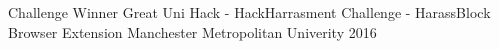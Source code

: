 
\begin{cvhonors}

  \cvhonor
    {Challenge Winner} %
    {Great Uni Hack - HackHarrasment Challenge - HarassBlock Browser Extension} %
    {Manchester Metropolitan Univerity} %
    {2016} %


\end{cvhonors}
